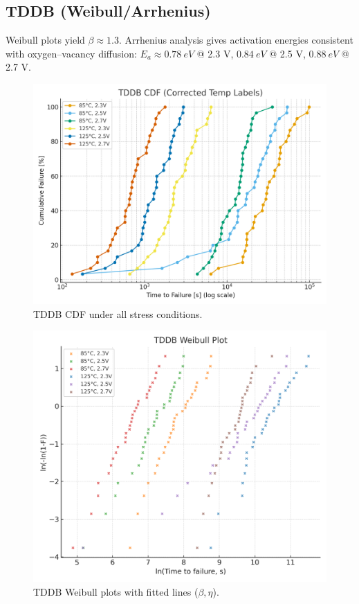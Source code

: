 \documentclass[conference]{IEEEtran}
\begin{document}
\subsection{TDDB (Weibull/Arrhenius)}
Weibull plots yield \(\beta \approx 1.3\).
Arrhenius analysis gives activation energies consistent with oxygen–vacancy diffusion:
\(E_a \approx \SI{0.78}{eV}\) @ 2.3 V, \(\SI{0.84}{eV}\) @ 2.5 V, \(\SI{0.88}{eV}\) @ 2.7 V.

\begin{figure}[t]
\centering
\includegraphics[width=\linewidth]{figures/fig4_tddb_cdf.png}
\caption{TDDB CDF under all stress conditions.}
\label{fig:tddb_cdf}
\end{figure}

\begin{figure}[t]
\centering
\includegraphics[width=\linewidth]{figures/fig4_tddb_weibull.png}
\caption{TDDB Weibull plots with fitted lines (\(\beta,\eta\)).}
\label{fig:tddb_weibull}
\end{figure}
\end{document}
